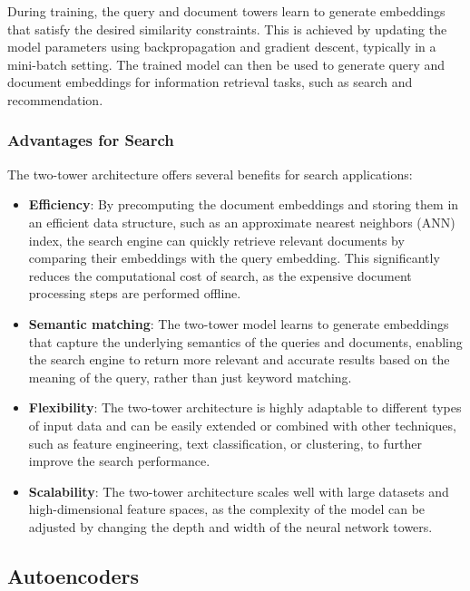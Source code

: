 \documentclass[12pt]{article}
\begin{document}
During training, the query and document towers learn to generate embeddings that satisfy the desired similarity constraints. This is achieved by updating the model parameters using backpropagation and gradient descent, typically in a mini-batch setting. The trained model can then be used to generate query and document embeddings for information retrieval tasks, such as search and recommendation.

\subsubsection{Advantages for Search}

The two-tower architecture offers several benefits for search applications:
\begin{itemize}
\item \textbf{Efficiency}: By precomputing the document embeddings and storing them in an efficient data structure, such as an approximate nearest neighbors (ANN) index, the search engine can quickly retrieve relevant documents by comparing their embeddings with the query embedding. This significantly reduces the computational cost of search, as the expensive document processing steps are performed offline.

\item \textbf{Semantic matching}: The two-tower model learns to generate embeddings that capture the underlying semantics of the queries and documents, enabling the search engine to return more relevant and accurate results based on the meaning of the query, rather than just keyword matching.

\item \textbf{Flexibility}: The two-tower architecture is highly adaptable to different types of input data and can be easily extended or combined with other techniques, such as feature engineering, text classification, or clustering, to further improve the search performance.

\item \textbf{Scalability}: The two-tower architecture scales well with large datasets and high-dimensional feature spaces, as the complexity of the model can be adjusted by changing the depth and width of the neural network towers.
\end{itemize}

\subsection{Autoencoders}
\end{document}
